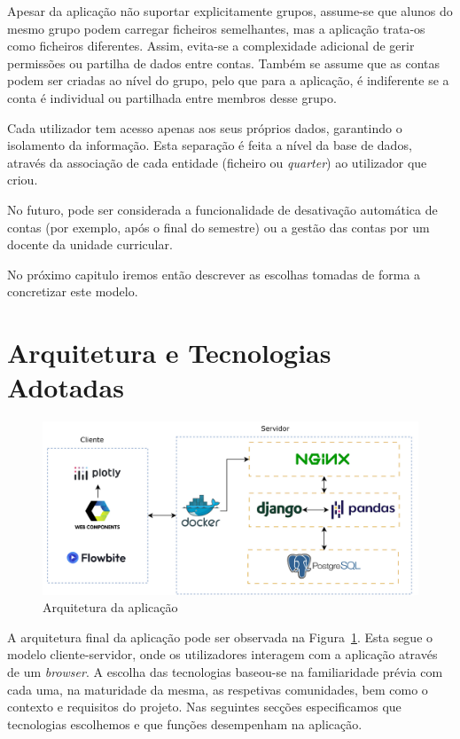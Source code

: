 Apesar da aplicação não suportar explicitamente grupos, assume-se que alunos do mesmo grupo podem carregar ficheiros semelhantes, mas a aplicação trata-os como ficheiros diferentes. Assim, evita-se a complexidade adicional de gerir permissões ou partilha de dados entre contas.  Também se assume que as contas podem ser criadas ao nível do grupo, pelo que para a aplicação, é indiferente se a conta é individual ou partilhada entre membros desse grupo.

Cada utilizador tem acesso apenas aos seus próprios dados, garantindo o isolamento da informação. Esta separação é feita a nível da base de dados, através da associação de cada entidade (ficheiro ou \textit{quarter}) ao utilizador que criou.

No futuro, pode ser considerada a funcionalidade de desativação automática de contas (por exemplo, após o final do semestre) ou a gestão das contas por um docente da unidade curricular.

No próximo capitulo iremos então descrever as escolhas tomadas de forma a concretizar este modelo.

\section{Arquitetura e Tecnologias Adotadas}
\label{sec:tec}

\begin{figure}[h]
\centering
\includegraphics[max width=\textwidth]{./img/arch}
\caption{Arquitetura da aplicação}
\label{fig:arquitectura}
\end{figure}

A arquitetura final da aplicação pode ser observada na Figura~\ref{fig:arquitectura}. Esta segue o modelo cliente-servidor, onde os utilizadores interagem com a aplicação através de um \textit{browser}. A escolha das tecnologias baseou-se na familiaridade prévia com cada uma, na maturidade da mesma, as respetivas comunidades, bem como o contexto e requisitos do projeto. Nas seguintes secções especificamos que tecnologias escolhemos e que funções desempenham na aplicação.


